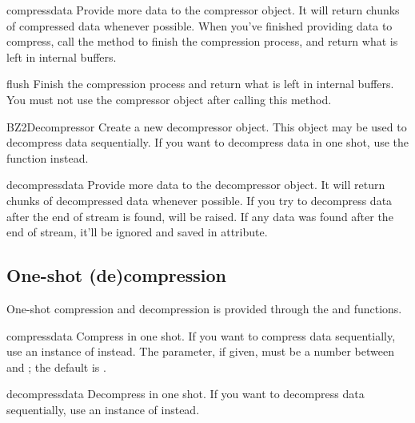 \begin{methoddesc}[BZ2Compressor]{compress}{data}
Provide more data to the compressor object. It will return chunks of compressed
data whenever possible. When you've finished providing data to compress, call
the  method to finish the compression process, and return what
is left in internal buffers.
\end{methoddesc}

\begin{methoddesc}[BZ2Compressor]{flush}{}
Finish the compression process and return what is left in internal buffers. You
must not use the compressor object after calling this method.
\end{methoddesc}

\begin{classdesc}{BZ2Decompressor}{}
Create a new decompressor object. This object may be used to decompress
data sequentially. If you want to decompress data in one shot, use the
 function instead.
\end{classdesc}

\begin{methoddesc}[BZ2Decompressor]{decompress}{data}
Provide more data to the decompressor object. It will return chunks of
decompressed data whenever possible. If you try to decompress data after the
end of stream is found,  will be raised. If any data was
found after the end of stream, it'll be ignored and saved in
 attribute.
\end{methoddesc}


\subsection{One-shot (de)compression}

One-shot compression and decompression is provided through the
 and  functions.

\begin{funcdesc}{compress}{data}
Compress  in one shot. If you want to compress data sequentially,
use an instance of  instead. The 
parameter, if given, must be a number between  and ;
the default is .
\end{funcdesc}

\begin{funcdesc}{decompress}{data}
Decompress  in one shot. If you want to decompress data
sequentially, use an instance of  instead.
\end{funcdesc}
